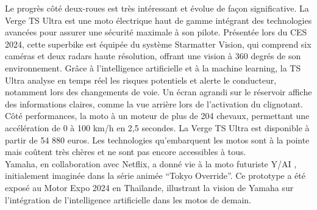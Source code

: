 Le progrès côté deux-roues est très intéressant et évolue de façon significative.
La Verge TS Ultra est une moto électrique \cite{lenoir_cette_2024} haut de gamme intégrant des technologies avancées pour assurer une sécurité maximale à son pilote. Présentée lors du CES 2024, cette superbike est équipée du système Starmatter Vision, qui comprend six caméras et deux radars haute résolution, offrant une vision à 360 degrés de son environnement. Grâce à l’intelligence artificielle et à la machine learning, la TS Ultra analyse en temps réel les risques potentiels et alerte le conducteur, notamment lors des changements de voie. Un écran agrandi sur le réservoir affiche des informations claires, comme la vue arrière lors de l’activation du clignotant. Côté performances, la moto à un moteur de plus de 204 chevaux, permettant une accélération de 0 à 100 km/h en 2,5 secondes. La Verge TS Ultra est disponible à partir de 54 880 euros.
Les technologies qu'embarquent les motos sont à la pointe mais coûtent très chères et ne sont pas encore accessibles à tous.\\
Yamaha, en collaboration avec Netflix, a donné vie à la moto futuriste Y/AI \cite{texier_quand_2024} , initialement imaginée dans la série animée “Tokyo Override”. Ce prototype a été exposé au Motor Expo 2024 en Thaïlande, illustrant la vision de Yamaha sur l’intégration de l’intelligence artificielle dans les motos de demain.\\

